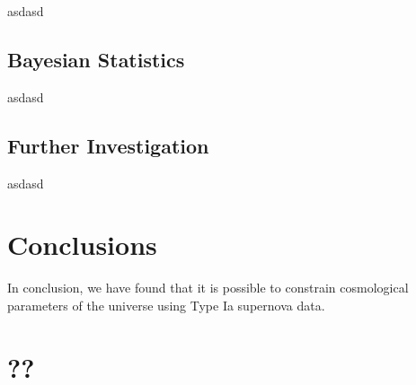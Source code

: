 \documentclass[twocolumn]{revtex4}
\begin{document}
asdasd

\vspace{-3ex}
\subsection{Bayesian Statistics} 
\vspace{-2ex}

asdasd

\vspace{-3ex}
\subsection{Further Investigation} 
\vspace{-2ex}

asdasd

\vspace{-5ex}
\section{Conclusions}
\vspace{-2ex}

In conclusion, we have found that it is possible to constrain cosmological parameters of the universe using Type Ia supernova data.

\vspace{-3ex}



\clearpage
\appendix

\vfill
\twocolumngrid
\vspace{-3ex}
\section{??}
\vspace{-2ex}



\clearpage
\end{document}
